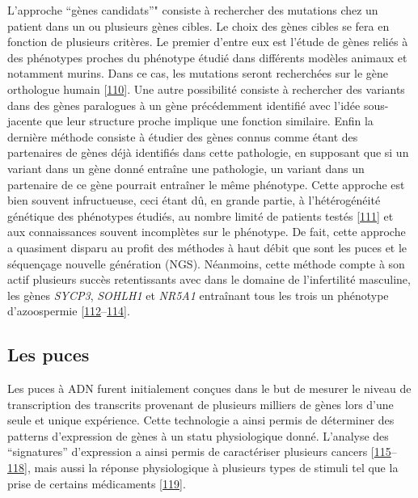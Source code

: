 \documentclass[12pt,a4paper,twoside]{ugathesis}
\theoremstyle{definition}
\theoremstyle{definition}
\theoremstyle{definition}
\theoremstyle{remark}
\begin{document}
L'approche ``gènes candidats''" consiste à rechercher des mutations chez
un patient dans un ou plusieurs gènes cibles. Le choix des gènes cibles
se fera en fonction de plusieurs critères. Le premier d'entre eux est
l'étude de gènes reliés à des phénotypes proches du phénotype étudié
dans différents modèles animaux et notamment murins. Dans ce cas, les
mutations seront recherchées sur le gène orthologue humain
{[}\protect\hyperlink{ref-DeBoer2015}{110}{]}. Une autre possibilité
consiste à rechercher des variants dans des gènes paralogues à un gène
précédemment identifié avec l'idée sous-jacente que leur structure
proche implique une fonction similaire. Enfin la dernière méthode
consiste à étudier des gènes connus comme étant des partenaires de gènes
déjà identifiés dans cette pathologie, en supposant que si un variant
dans un gène donné entraîne une pathologie, un variant dans un
partenaire de ce gène pourrait entraîner le même phénotype. Cette
approche est bien souvent infructueuse, ceci étant dû, en grande partie,
à l'hétérogénéité génétique des phénotypes étudiés, au nombre limité de
patients testés {[}\protect\hyperlink{ref-ElInati2012}{111}{]} et aux
connaissances souvent incomplètes sur le phénotype. De fait, cette
approche a quasiment disparu au profit des méthodes à haut débit que
sont les puces et le séquençage nouvelle génération (NGS). Néanmoins,
cette méthode compte à son actif plusieurs succès retentissants avec
dans le domaine de l'infertilité masculine, les gènes \emph{SYCP3},
\emph{SOHLH1} et \emph{NR5A1} entraînant tous les trois un phénotype
d'azoospermie
{[}\protect\hyperlink{ref-Miyamoto2003}{112}--\protect\hyperlink{ref-Bashamboo2010}{114}{]}.

\newpage

\subsection{Les puces}\label{les-puces}

Les puces à ADN furent initialement conçues dans le but de mesurer le
niveau de transcription des transcrits provenant de plusieurs milliers
de gènes lors d'une seule et unique expérience. Cette technologie a
ainsi permis de déterminer des patterns d'expression de gènes à un statu
physiologique donné. L'analyse des ``signatures'' d'expression a ainsi
permis de caractériser plusieurs cancers
{[}\protect\hyperlink{ref-Alon1999}{115}--\protect\hyperlink{ref-VantVeer2002}{118}{]},
mais aussi la réponse physiologique à plusieurs types de stimuli tel que
la prise de certains médicaments
{[}\protect\hyperlink{ref-Brachat2002}{119}{]}.
\end{document}
